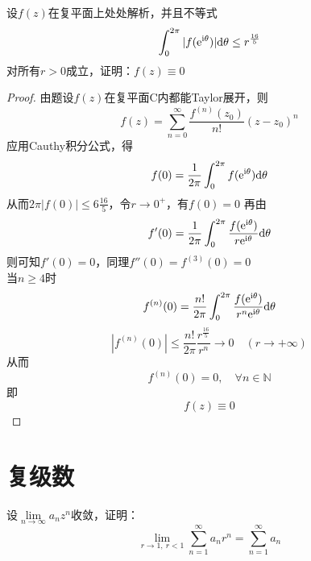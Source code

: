 \begin{proposition}

    设$f(z)$在复平面上处处解析，并且不等式
    $$\int_{0}^{2\pi}{|f(\mathrm{e^{\mathrm{i} \theta}})|}\mathrm{d} \theta \leq r^{\frac{16}{5}} $$
    对所有$r > 0$成立，证明：$f(z) \equiv 0$

\end{proposition}

\begin{proof}

    由题设$f(z)$在复平面$\mathrm{C}$内都能\textup{Taylor}展开，则
    $$f(z) = \sum\limits_{n=0}^{\infty}{\dfrac{f^{(n)}(z_0)}{n!}(z - z_0)^n}$$
    应用\textup{Cauthy}积分公式，得
    $$f(0) = \dfrac{1}{2\pi} \int_{0}^{2\pi}{f(\mathrm{e}^{\mathrm{i} \theta})}\mathrm{d} \theta$$
    从而$2\pi|f(0)| \leq 6{\frac{16}{5}}$，令$r\to0^{+}$，有$f(0) = 0$
    再由
    $$f'(0) = \dfrac{1}{2\pi} \int_{0}^{2\pi}{\dfrac{f(\mathrm{e}^{\mathrm{i} \theta})}{r\mathrm{e}^{\mathrm{i} \theta}}}\mathrm{d} \theta$$
    则可知$f'(0) = 0$，同理$f''(0) = f^{(3)}(0) = 0$\\
    当$n \geq 4$时
    $$f^{(n)}(0) =  \dfrac{n!}{2\pi} \int_{0}^{2\pi}{\dfrac{f(\mathrm{e}^{\mathrm{i}\theta})}{r^n \mathrm{e}^{\mathrm{i}\theta}}}\mathrm{d} \theta$$
    $$|f^{(n)}(0)| \leq \dfrac{n!}{2\pi} \dfrac{r^{\frac{16}{5}}}{r^n} \to 0\quad(r\to+\infty)$$
    从而
    $$f^{(n)}(0) = 0,\quad \forall n \in \mathbb{N}$$
    即
    $$f(z) \equiv 0$$
    
\end{proof}

\section{复级数}

\begin{proposition}

    设$\lim\limits_{n\to\infty}{a_nz^n}$收敛，证明：
    $$\lim\limits_{r \to 1,\ r < 1}{\sum\limits_{n=1}^{\infty}{a_nr^n}} = \sum\limits_{n=1}^{\infty}{a_n}$$

\end{proposition}

